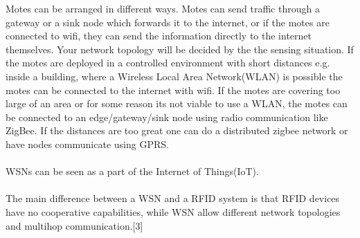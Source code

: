 \documentclass[]{uiophd}
\begin{document}
Motes can be arranged in different ways. Motes can send traffic through a gateway or a sink node which forwards it to the internet, or if the motes are connected to wifi, they can send the information directly to the internet themselves. Your network topology will be decided by the the sensing situation. If the motes are deployed in a controlled environment with short distances e.g. inside a building, where a Wireless Local Area Network(WLAN) is possible the motes can be connected to the internet with wifi. If the motes are covering too large of an area or for some reason its not viable to use a WLAN, the motes can be connected to an edge/gateway/sink node using radio communication like ZigBee. If the distances are too great one can do a distributed zigbee network or have nodes communicate using GPRS.
\\\\
WSNs can be seen as a part of the Internet of Things(IoT).
\\\\
The main difference between a WSN and a RFID system is that RFID devices have no cooperative capabilities, while WSN allow different network topologies and multihop communication.[3]
\end{document}
